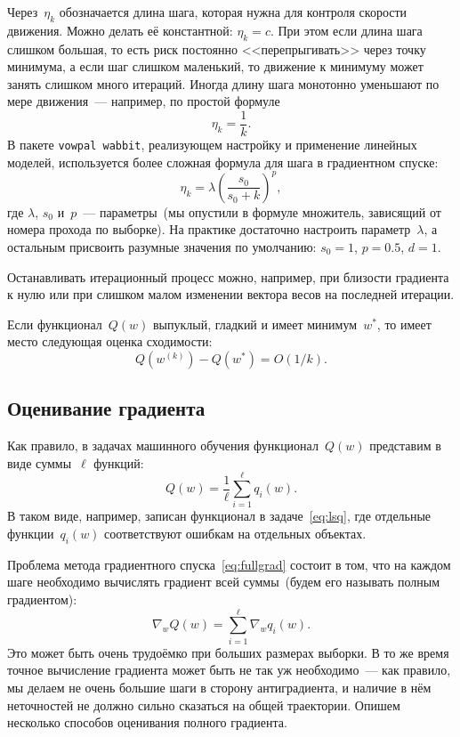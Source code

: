 \documentclass[12pt,fleqn]{article}
\begin{document}
Через~$\eta_k$ обозначается длина шага, которая нужна для контроля скорости движения.
Можно делать её константной: $\eta_k = c$.
При этом если длина шага слишком большая, то есть риск постоянно <<перепрыгивать>> через точку минимума,
а если шаг слишком маленький, то движение к минимуму может занять слишком много итераций.
Иногда длину шага монотонно уменьшают по мере движения~--- например, по простой формуле
\[
    \eta_k
    =
    \frac{1}{k}.
\]
В пакете \texttt{vowpal wabbit}, реализующем настройку и применение линейных моделей,
используется более сложная формула для шага в градиентном спуске:
\[
    \eta_k
    =
    \lambda
    \left(
        \frac{s_0}{s_0 + k}
    \right)^p,
\]
где $\lambda$, $s_0$ и~$p$~--- параметры~(мы опустили в формуле множитель, зависящий от номера прохода по выборке).
На практике достаточно настроить параметр~$\lambda$, а остальным
присвоить разумные значения по умолчанию: $s_0 = 1$, $p = 0.5$, $d = 1$.

Останавливать итерационный процесс можно, например, при близости градиента к нулю
или при слишком малом изменении вектора весов на последней итерации.

Если функционал~$Q(w)$ выпуклый, гладкий и имеет минимум~$w^*$,
то имеет место следующая оценка сходимости:
\[
    Q(w^{(k)}) - Q(w^*)
    =
    O(1 / k).
\]

\subsection{Оценивание градиента}

Как правило, в задачах машинного обучения функционал~$Q(w)$ представим в виде суммы~$\ell$ функций:
\[
    Q(w)
    =
    \frac{1}{\ell}
    \sum_{i = 1}^{\ell}
        q_i(w).
\]
В таком виде, например, записан функционал в задаче~\eqref{eq:lsq},
где отдельные функции~$q_i(w)$ соответствуют ошибкам на отдельных объектах.

Проблема метода градиентного спуска~\eqref{eq:fullgrad} состоит в том,
что на каждом шаге необходимо вычислять градиент всей суммы~(будем его называть полным градиентом):
\[
    \nabla_w Q(w)
    =
    \sum_{i = 1}^{\ell}
        \nabla_w q_i(w).
\]
Это может быть очень трудоёмко при больших размерах выборки.
В то же время точное вычисление градиента может быть не так уж необходимо~---
как правило, мы делаем не очень большие шаги в сторону антиградиента,
и наличие в нём неточностей не должно сильно сказаться на общей траектории.
Опишем несколько способов оценивания полного градиента.
\end{document}
